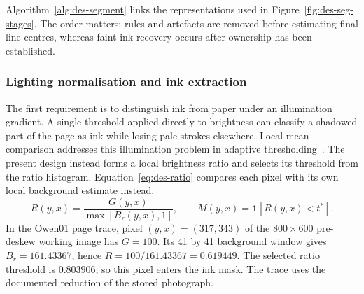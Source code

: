 Algorithm~\ref{alg:des-segment} links the representations used in Figure~\ref{fig:des-seg-stages}. The order matters: rules and artefacts are removed before estimating final line centres, whereas faint-ink recovery occurs after ownership has been established.

\begin{designalgorithm}
\caption{Photographed page to ordered line crops}
\label{alg:des-segment}
\begin{designpseudo}
\end{designpseudo}
\end{designalgorithm}

\subsubsection{Lighting normalisation and ink extraction}
The first requirement is to distinguish ink from paper under an illumination gradient. A single threshold applied directly to brightness can classify a shadowed part of the page as ink while losing pale strokes elsewhere. Local-mean comparison addresses this illumination problem in adaptive thresholding~\cite[pp.~2--3]{bradley2007}. The present design instead forms a local brightness ratio and selects its threshold from the ratio histogram. Equation~\ref{eq:des-ratio} compares each pixel with its own local background estimate instead.
\begin{equation}
R(y,x)=\frac{G(y,x)}{\max[B_r(y,x),1]},\qquad
M(y,x)=\mathbf{1}[R(y,x)<t^*].
\label{eq:des-ratio}
\end{equation}
In the Owen01 page trace, pixel $(y,x)=(317,343)$ of the $800\times600$ pre-deskew working image has $G=100$. Its 41 by 41 background window gives $B_r=161.43367$, hence $R=100/161.43367=0.619449$. The selected ratio threshold is $0.803906$, so this pixel enters the ink mask. The trace uses the documented reduction of the stored photograph.

